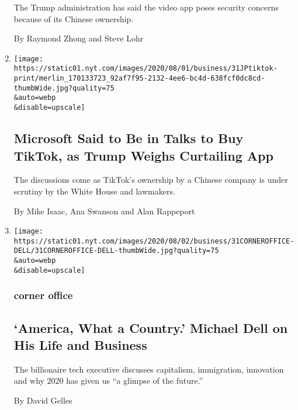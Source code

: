 \begin{enumerate}
  The Trump administration has said the video app poses security
  concerns because of its Chinese ownership.

  By Raymond Zhong and Steve Lohr
\item
  \href{/2020/07/31/technology/tiktok-microsoft.html}{}

  \texttt{[image: https://static01.nyt.com/images/2020/08/01/business/31JPtiktok-print/merlin\_170133723\_92af7f95-2132-4ee6-bc4d-638fcf0dc8cd-thumbWide.jpg?quality=75\\\&auto=webp\\\&disable=upscale]}

  \hypertarget{microsoft-said-to-be-in-talks-to-buy-tiktok-as-trump-weighs-curtailing-app}{%
  \subsection{Microsoft Said to Be in Talks to Buy TikTok, as Trump
  Weighs Curtailing
  App}\label{microsoft-said-to-be-in-talks-to-buy-tiktok-as-trump-weighs-curtailing-app}}

  The discussions come as TikTok's ownership by a Chinese company is
  under scrutiny by the White House and lawmakers.

  By Mike Isaac, Ana Swanson and Alan Rappeport
\item
  \href{/2020/07/31/business/michael-dell-corner-office.html}{}

  \texttt{[image: https://static01.nyt.com/images/2020/08/02/business/31CORNEROFFICE-DELL/31CORNEROFFICE-DELL-thumbWide.jpg?quality=75\\\&auto=webp\\\&disable=upscale]}

  \hypertarget{corner-office}{%
  \subsubsection{corner office}\label{corner-office}}

  \hypertarget{america-what-a-country-michael-dell-on-his-life-and-business}{%
  \subsection{`America, What a Country.' Michael Dell on His Life and
  Business}\label{america-what-a-country-michael-dell-on-his-life-and-business}}

  The billionaire tech executive discusses capitalism, immigration,
  innovation and why 2020 has given us ``a glimpse of the future.''

  By David Gelles
\end{enumerate}

